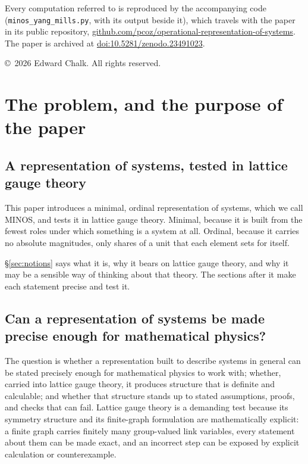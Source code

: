 \documentclass[11pt,a4paper]{article}
\theoremstyle{plain}
\theoremstyle{definition}
\theoremstyle{remark}
\begin{document}
\noindent\small Every computation referred to is reproduced by the accompanying code (\texttt{minos\_yang\_mills.py}, with its output beside it), which travels with the paper in its public repository, \href{https://github.com/pcoz/operational-representation-of-systems}{github.com/pcoz/operational-representation-of-systems}. The paper is archived at \href{https://doi.org/10.5281/zenodo.23491023}{doi:10.5281/zenodo.23491023}.

\noindent\copyright\ 2026 Edward Chalk. All rights reserved.
\normalsize

\clearpage
\section{The problem, and the purpose of the paper}

\subsection{A representation of systems, tested in lattice gauge theory}

This paper introduces a minimal, ordinal representation of systems, which we call MINOS, and tests it in lattice gauge theory. Minimal, because it is built from the fewest roles under which something is a system at all. Ordinal, because it carries no absolute magnitudes, only shares of a unit that each element sets for itself.

\S\ref{sec:notions} says what it is, why it bears on lattice gauge theory, and why it may be a sensible way of thinking about that theory. The sections after it make each statement precise and test it.

\subsection{Can a representation of systems be made precise enough for mathematical physics?}

The question is whether a representation built to describe systems in general can be stated precisely enough for mathematical physics to work with; whether, carried into lattice gauge theory, it produces structure that is definite and calculable; and whether that structure stands up to stated assumptions, proofs, and checks that can fail. Lattice gauge theory is a demanding test because its symmetry structure and its finite-graph formulation are mathematically explicit: a finite graph carries finitely many group-valued link variables, every statement about them can be made exact, and an incorrect step can be exposed by explicit calculation or counterexample.
\end{document}
